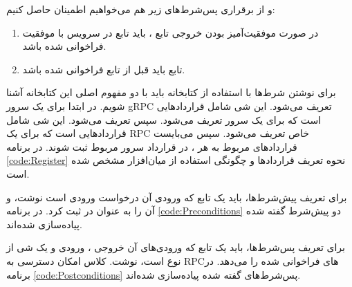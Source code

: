 و از برقراری پس‌شرط‌های زیر هم می‌خواهیم اطمینان حاصل کنیم:
\begin{enumerate}
\item
در صورت موفقیت‌آمیز بودن خروجی تابع
، باید تابع
در سرویس
با موفقیت فراخوانی شده باشد.
\item
تابع
باید قبل از تابع
فراخوانی شده باشد.
\end{enumerate}


برای نوشتن شرط‌ها با استفاده از کتابخانه
باید با دو مفهوم اصلی این کتابخانه آشنا شویم. در ابتدا
برای یک سرور gRPC تعریف می‌شود. این شی شامل قراردادهایی است که برای یک سرور تعریف می‌شود. سپس
تعریف می‌شود. این شی شامل قراردادهایی است که برای یک RPC خاص تعریف می‌شود. سپس می‌بایست قراردادهای مربوط به هر
،
در قرارداد سرور مربوط ثبت شوند. در برنامه 
\ref{code:Register}
نحوه تعریف قراردادها و چگونگی استفاده از میان‌افزار مشخص شده است.

\singlespacing
\begin{figure}
	\begin{LTR}
		
	\end{LTR}
\end{figure}
\doublespacing

برای تعریف پیش‌شرط‌ها، باید یک تابع که ورودی آن درخواست ورودی
است نوشت، و آن‌ را به عنوان 
در
ثبت کرد. در برنامه
\ref{code:Preconditions}
دو پیش‌شرط گفته شده پیاده‌سازی شده‌اند.

\singlespacing
\begin{figure}
	\begin{LTR}
		
	\end{LTR}
\end{figure}
\doublespacing

برای تعریف پس‌شرط‌ها، باید یک تابع که ورودی‌‌های آن خروجی
،
ورودی
و یک شی از نوع 
است، نوشت. کلاس 
امکان دسترسی به RPCهای فراخوانی شده را می‌دهد. در برنامه
\ref{code:Postconditions}
پس‌شرط‌های گفته شده پیاده‌سازی شده‌اند.

\singlespacing
\begin{figure}
	\begin{LTR}
		
	\end{LTR}
\end{figure}
\doublespacing
